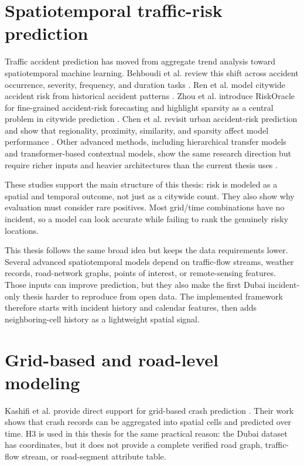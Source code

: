 \section{Spatiotemporal traffic-risk prediction}

Traffic accident prediction has moved from aggregate trend analysis toward spatiotemporal machine learning. Behboudi et al. review this shift across accident occurrence, severity, frequency, and duration tasks \cite{behboudi2024review}. Ren et al. model citywide accident risk from historical accident patterns \cite{ren2017citywide}. Zhou et al. introduce RiskOracle for fine-grained accident-risk forecasting and highlight sparsity as a central problem in citywide prediction \cite{zhou2020riskoracle}. Chen et al. revisit urban accident-risk prediction and show that regionality, proximity, similarity, and sparsity affect model performance \cite{chen2024urbanrisk}. Other advanced methods, including hierarchical transfer models and transformer-based contextual models, show the same research direction but require richer inputs and heavier architectures than the current thesis uses \cite{an2022hintnet,saleh2022contextualvit}.

These studies support the main structure of this thesis: risk is modeled as a spatial and temporal outcome, not just as a citywide count. They also show why evaluation must consider rare positives. Most grid/time combinations have no incident, so a model can look accurate while failing to rank the genuinely risky locations.

This thesis follows the same broad idea but keeps the data requirements lower. Several advanced spatiotemporal models depend on traffic-flow streams, weather records, road-network graphs, points of interest, or remote-sensing features. Those inputs can improve prediction, but they also make the first Dubai incident-only thesis harder to reproduce from open data. The implemented framework therefore starts with incident history and calendar features, then adds neighboring-cell history as a lightweight spatial signal.

\section{Grid-based and road-level modeling}

Kashifi et al. provide direct support for grid-based crash prediction \cite{kashifi2022grid}. Their work shows that crash records can be aggregated into spatial cells and predicted over time. H3 is used in this thesis for the same practical reason: the Dubai dataset has coordinates, but it does not provide a complete verified road graph, traffic-flow stream, or road-segment attribute table.

